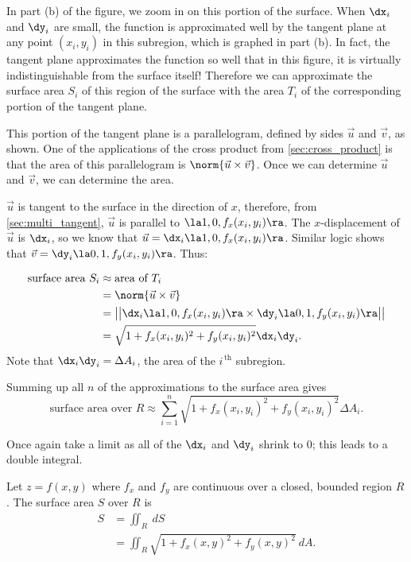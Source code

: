In part (b) of the figure, we zoom in on this portion of the surface. When $\dx_i$ and $\dy_i$ are small, the function is approximated well by the tangent plane at any point $(x_i,y_i)$ in this subregion, which is graphed in part (b). In fact, the tangent plane approximates the function so well that in this figure, it is virtually indistinguishable from the surface itself! Therefore we can approximate the surface area $S_i$ of this region of the surface with the area $T_i$ of the corresponding portion of the tangent plane.

This portion of the tangent plane is a parallelogram, defined by sides $\vec u$ and $\vec v$, as shown. One of the applications of the cross product from \autoref{sec:cross_product} is that the area of this parallelogram is $\norm{\vec u\times \vec v}$. Once we can determine $\vec u$ and $\vec v$, we can determine the area.

$\vec u$ is tangent to the surface in the direction of $x$, therefore, from \autoref{sec:multi_tangent}, $\vec u$ is parallel to $\la 1,0,f_x(x_i,y_i)\ra$. The $x$-displacement of $\vec u$ is $\dx_i$, so we know that $\vec u = \dx_i\la 1,0,f_x(x_i,y_i)\ra$. Similar logic shows that $\vec v = \dy_i\la 0,1,f_y(x_i,y_i)\ra$. Thus:

\begin{align*}
\text{surface area $S_i$} &\approx \text{area of  $T_i$}\\
				&= \norm{\vec u\times \vec v}\\
				&= \big|\big|\dx_i\la 1,0,f_x(x_i,y_i)\ra\times\dy_i\la 0,1,f_y(x_i,y_i)\ra\big|\big|\\
				&=\sqrt{1+f_x(x_i,y_i)^2+f_y(x_i,y_i)^2}\dx_i\dy_i.
\end{align*}
Note that $\dx_i\dy_i = \Delta A_i$, the area of the $i^{\,\text{th}}$ subregion.

Summing up all $n$ of the approximations to the surface area gives
$$\text{surface area over $R$} \approx \sum_{i=1}^n \sqrt{1+f_x(x_i,y_i)^2+f_y(x_i,y_i)^2}\Delta A_i.$$

Once again take a limit as all of the $\dx_i$ and $\dy_i$ shrink to 0; this leads to a double integral.

{Let $z=f(x,y)$ where $f_x$ and $f_y$ are continuous over a closed, bounded region $R$. The surface area $S$ over $R$ is 
\begin{align*}
S &= \iint_R \ dS\\
&=\iint_R \sqrt{1+f_x(x,y)^2+f_y(x,y)^2}\ dA.
\end{align*}
}

